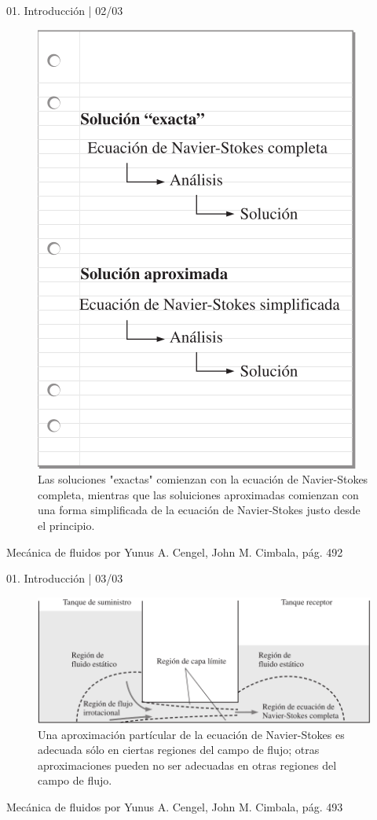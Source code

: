 \begin{frame}{01. Introducción | 02/03}
\justifying
\begin{figure}[H]
\centering
\includegraphics[scale=0.2]{Section_Files/S3-imagenes-Jhon/0002.png}
\caption{Las soluciones "exactas" comienzan con la ecuación de Navier-Stokes completa, mientras que las soluiciones aproximadas comienzan con una forma simplificada de la ecuación de Navier-Stokes justo desde el principio.}
\end{figure}

{\tiny Mecánica de fluidos por Yunus A. Cengel, John M. Cimbala, pág. 492}
\end{frame}

\begin{frame}{01. Introducción | 03/03}
\justifying
\begin{figure}[H]
\centering
\includegraphics[scale=0.2]{Section_Files/S3-imagenes-Jhon/0003.png}
\caption{Una aproximación partícular de la ecuación de Navier-Stokes es adecuada sólo en ciertas regiones del campo de flujo; otras aproximaciones pueden no ser adecuadas en otras regiones del campo de flujo.}
\end{figure}

{\tiny Mecánica de fluidos por Yunus A. Cengel, John M. Cimbala, pág. 493}
\end{frame}


